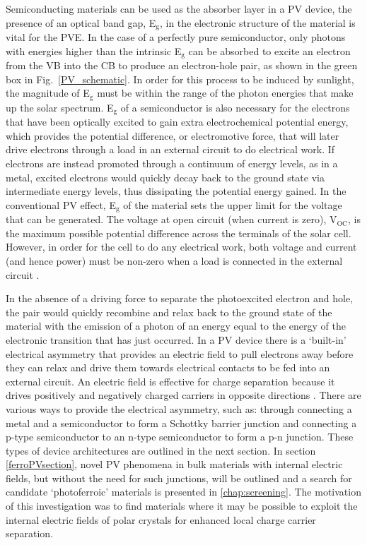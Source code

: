\documentclass[11pt, twoside]{report}
\begin{document}
Semiconducting materials can be used as the absorber layer in a PV device, the presence of an optical band gap, E$_\mathrm{g}$, in the electronic structure of the material is vital for the PVE. In the case of a perfectly pure semiconductor, only photons with energies higher than the intrinsic E$_\mathrm{g}$ can be absorbed to excite an electron from the VB into the CB to produce an electron-hole pair, as shown in the green box in Fig.~\ref{PV_schematic}. In order for this process to be induced by sunlight, the magnitude of E$_\mathrm{g}$ must be within the range of the photon energies that make up the solar spectrum. E$_\mathrm{g}$ of a semiconductor is also necessary for the electrons that have been optically excited to gain extra electrochemical potential energy, which provides the potential difference, or electromotive force, that will later drive electrons through a load in an external circuit to do electrical work. If electrons are instead promoted through a continuum of energy levels, as in a metal, excited electrons would quickly decay back to the ground state via intermediate energy levels, thus dissipating the potential energy gained. In the conventional PV effect, E$_\mathrm{g}$ of the material sets the upper limit for the voltage that can be generated. The voltage at open circuit (when current is zero), V$_{\mathrm{OC}}$, is the maximum possible potential difference across the terminals of the solar cell. However, in order for the cell to do any electrical work, both voltage and current (and hence power) must be non-zero when a load is connected in the external circuit \cite{Nelson3}.

In the absence of a driving force to separate the photoexcited electron and hole, the pair would quickly recombine and relax back to the ground state of the material with the emission of a photon of an energy equal to the energy of the electronic transition that has just occurred. In a PV device there is a `built-in' electrical asymmetry that provides an electric field to pull electrons away before they can relax and drive them towards electrical contacts to be fed into an external circuit. An electric field is effective for charge separation because it drives positively and negatively charged carriers in opposite directions \cite{Nelson5}. There are various ways to provide the electrical asymmetry, such as: through connecting a metal and a semiconductor to form a Schottky barrier junction and connecting a p-type semiconductor to an n-type semiconductor to form a p-n junction. These types of device architectures are outlined in the next section. In section \ref{ferroPVsection}, novel PV phenomena in bulk materials with internal electric fields, but without the need for such junctions, will be outlined and a search for candidate `photoferroic' materials is presented in \autoref{chap:screening}. The motivation of this investigation was to find materials where it may be possible to exploit the internal electric fields of polar crystals for enhanced local charge carrier separation.
\end{document}
